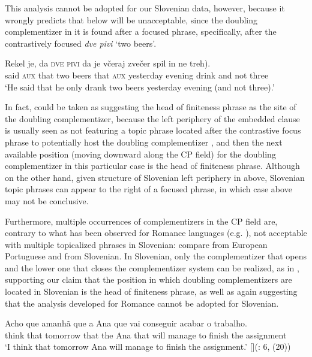 \documentclass[output=paper,
]{langscibook}
\begin{document}
\noindent This analysis cannot be adopted for our Slovenian data, however, because it wrongly predicts that  below will be unacceptable, since the doubling complementizer in it is found after a focused phrase, specifically, after the contrastively focused \textit{dve pivi} `two beers'. 


\begin{exe} 
\ex \label{ex:plesnicar:38}
\gll Rekel je,	da	\textsc{dve}	\textsc{pivi} da	je včeraj zvečer spil \minsp{(} in	ne	treh).\\
  said	\textsc{aux} that two beers	that \textsc{aux} yesterday evening drink {} and not three\\
\trans `He said that he only drank two beers yesterday evening (and not three).'
\end{exe}

\noindent In fact,  could be taken as suggesting the head of finiteness phrase as the site of the doubling complementizer, because the left periphery of the embedded clause is usually seen as not featuring a topic phrase located after the contrastive focus phrase to potentially host the doubling complementizer \citep{rizzi1997}, and then the next available position (moving downward along the CP field) for the doubling complementizer in this particular case is the head of finiteness phrase. Although on the other hand, given  structure of Slovenian left periphery in  above, Slovenian topic phrases can appear to the right of a focused phrase, in which case  above may not be conclusive.

Furthermore, multiple occurrences of complementizers in the CP field are, contrary to what has been observed for Romance languages (e.g. \citealt{ledgeway2005, mascarenhas2007, villa2012}), not acceptable with multiple topicalized phrases in Slovenian: compare  from European Portuguese  and  from Slovenian. In Slovenian, only the complementizer that opens and the lower one that closes the complementizer system can be realized, as in , supporting our claim that the position in which doubling complementizers are located in Slovenian is the head of finiteness phrase, as well as again suggesting that the analysis developed for Romance cannot be adopted for Slovenian.

\begin{exe} 
\ex \label{ex:plesnicar:41}
\gll Acho 	que 	amanh{ã} 	que 	a 	Ana 	que 	vai 	conseguir acabar 	o 	trabalho.  \\
  think 	that 	tomorrow 	that 	the 	Ana 	that 	will 	manage {to finish} 	the 	assignment\\
\trans `I think that tomorrow Ana will manage to finish the assignment.'
\exi{}[]{\hfill(\citealt{mascarenhas2007}: 6, (20))}
\end{exe}
\end{document}
